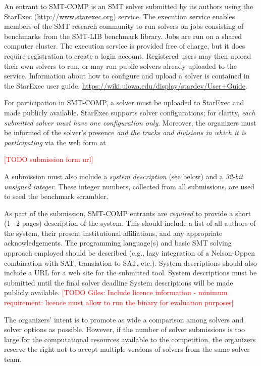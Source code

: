 \documentclass[12pt]{article}
\newcommand{\rem}[1]{\textcolor{red}{[#1]}}
\newcommand{\todo}[1]{\rem{TODO #1}}
\begin{document}
%
An entrant to SMT-COMP is an SMT solver submitted by its authors using
the StarExec (\url{http://www.starexec.org}) service.  The execution
service enables members of the SMT research community to run solvers
on jobs consisting of benchmarks from the SMT-LIB benchmark library.
Jobs are run on a shared computer cluster.  The execution service is
provided free of charge, but it does require registration to create a
login account.  Registered users may then upload their own solvers to
run, or may run public solvers already uploaded to the service.
Information about how to configure and upload a solver is contained in
the StarExec user guide,
\url{https://wiki.uiowa.edu/display/stardev/User+Guide}.

For participation in SMT-COMP, a solver must be uploaded to StarExec
and made publicly available.  StarExec supports solver configurations;
for clarity, \emph{each submitted solver must have one configuration
  only}.  Moreover, the organizers must be informed of the solver's
presence \emph{and the tracks and divisions in which it is
  participating} via the web form at
\begin{center}
  \todo{\url{}submission form url}
\end{center}
A submission must also include a \emph{system description} (see below) and a
\emph{32-bit unsigned integer}.
 These integer numbers, collected from all submissions, are used to seed the
benchmark scrambler.

%
As part of the submission, SMT-COMP entrants are \emph{required} to provide a
short (1–-2 pages) description of the system.  This should include a list of
all authors of the system, their present institutional affiliations, and any
appropriate acknowledgements.  The programming language(s) and basic SMT
solving approach employed should be described (e.g., lazy integration of a
Nelson-Oppen combination with SAT, translation to SAT, etc.).  System
descriptions should also include a URL for a web site for the submitted tool.
System descriptions must be submitted until the final solver deadline System
descriptions will be made publicly available. \todo{Giles: Include licence information - minimum requirement: licence must allow to run the binary for evaluation purposes}

%
The organizers' intent is to promote as wide a comparison among
solvers and solver options as possible.  However, if the number of
solver submissions is too large for the computational resources
available to the competition, the organizers reserve the right not to
accept multiple versions of solvers from the same solver team.
\end{document}
